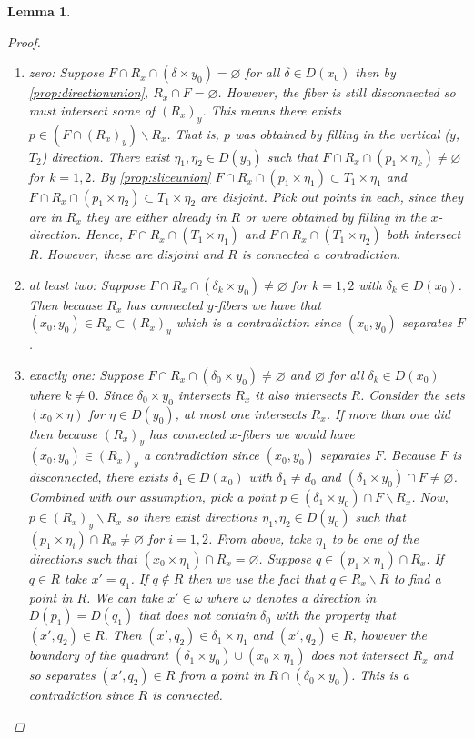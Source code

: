 \documentclass{article}
\newcommand{\rxy}{(R_x)_y}
\theoremstyle{mystyle}
\newtheorem{lem}[thm]{Lemma}
\theoremstyle{remark}
\begin{document}
\begin{lem}
\begin{proof}
        \begin{enumerate}
            \item zero: Suppose \(F\cap R_x \cap (\delta \times y_0)=\varnothing\) for all \(\delta\in D(x_0)\) then by \ref{prop:directionunion}, $R_x \cap F=\varnothing$. However, the fiber is still disconnected so must intersect some of $\rxy$. This means there exists $p\in (F\cap \rxy)\smallsetminus R_x$. That is, $p$ was obtained by filling in the vertical ($y$, $T_2$) direction. There exist $\eta_1, \eta_2\in D(y_0)$ such that $F\cap R_x \cap (p_1 \times \eta_k) \neq \varnothing$ for $k=1,2$. By \ref{prop:sliceunion} \(F\cap R_x \cap (p_1 \times \eta_1)\subset T_1\times \eta_1\) and \(F \cap R_x \cap (p_1 \times \eta_2)\subset T_1\times \eta_2\) are disjoint. Pick out points in each, since they are in $R_x$ they are either already in $R$ or were obtained by filling in the $x$-direction. Hence, $F\cap R_x \cap (T_1\times \eta_1)$ and $F\cap R_x \cap (T_1\times \eta_2)$ both intersect $R$. However, these are disjoint and $R$ is connected a contradiction.
            \item at least two: Suppose \(F\cap R_x\cap(\delta_k \times y_0)\neq\varnothing\) for $k=1,2$ with $\delta_k\in D(x_0)$. Then because $R_x$ has connected $y$-fibers we have that $(x_0,y_0)\in R_x\subset \rxy$ which is a contradiction since $(x_0,y_0)$ separates $F$.
            \item exactly one: Suppose \(F\cap R_x\cap(\delta_0 \times y_0)\neq\varnothing\) and $\varnothing$ for all $\delta_k\in D(x_0)$ where $k\neq 0$. Since $\delta_0\times y_0$ intersects $R_x$ it also intersects $R$. Consider the sets $(x_0\times \eta)$ for $\eta\in D(y_0)$, at most one intersects $R_x$. If more than one did then because $\rxy$ has connected $x$-fibers we would have $(x_0,y_0)\in\rxy$ a contradiction since $(x_0,y_0)$ separates $F$. Because $F$ is disconnected, there exists $\delta_1\in D(x_0)$ with $\delta_1\neq d_0$ and $(\delta_1\times y_0)\cap F\neq \varnothing$. Combined with our assumption, pick a point $p\in (\delta_1\times y_0)\cap F\smallsetminus R_x$. Now, $p\in\rxy\smallsetminus R_x$ so there exist directions $\eta_1,\eta_2\in D(y_0)$ such that $(p_1\times \eta_i)\cap R_x\neq\varnothing$ for $i=1,2$. From above, take $\eta_1$ to be one of the directions such that $(x_0\times \eta_1)\cap R_x =\varnothing$. Suppose $q\in (p_1\times \eta_1)\cap R_x$. If $q\in R$ take $x'=q_1$. If $q\not\in R$ then we use the fact that $q\in R_x\smallsetminus R$ to find a point in $R$. We can take $x'\in \omega$ where $\omega$ denotes a direction in $D(p_1)=D(q_1)$ that does not contain $\delta_0$ with the property that $(x',q_2)\in R$. Then $(x', q_2)\in \delta_1\times \eta_1$ and $(x',q_2)\in R$, however the boundary of the quadrant $(\delta_1\times y_0)\cup (x_0\times \eta_1)$ does not intersect $R_x$ and so separates $(x',q_2)\in R$ from a point in $R\cap (\delta_0\times y_0)$. This is a contradiction since $R$ is connected.

\end{enumerate}
\end{proof}
\end{lem}
\end{document}
